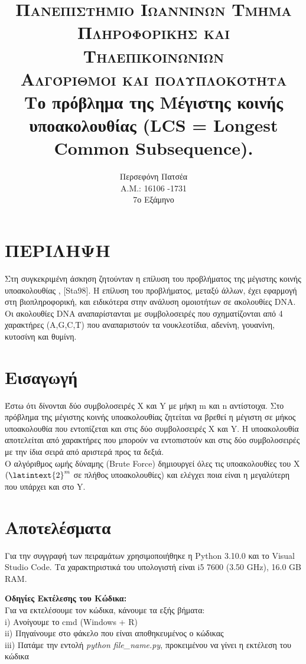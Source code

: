 \documentclass[a4paper,12pt]{report}
\title{
	\usefont{OT1}{bch}{b}{n}
	\normalfont \normalsize \textsc{Πανεπιστήμιο Ιωαννίνων Τμήμα Πληροφορικής και Τηλεπικοινωνίων} \\ [1em]
	\normalfont \normalsize \textsc{Αλγόριθμοι και πολυπλοκότητα} \\[0.5cm]
	\huge Το πρόβλημα της Μέγιστης κοινής υποακολουθίας ({\lat LCS = Longest Common Subsequence}).
	\\[0.5cm]
}
\author{ Περσεφόνη Πατσέα 
	\\Α.Μ.: 16106 -1731 
	\\ 7ο Εξάμηνο}
\newcommand{\lat} {\latintext}
\begin{document}
	\maketitle
	
	\section*{ΠΕΡΙΛΗΨΗ} 
	Στη συγκεκριμένη άσκηση ζητούνταν η επίλυση του προβλήματος της μέγιστης κοινής υποακολουθίας {\lat [Bla20], [Sta98]}. Η επίλυση του προβλήματος, μεταξύ άλλων, έχει εφαρμογή στη βιοπληροφορική, και ειδικότερα στην ανάλυση ομοιοτήτων σε ακολουθίες {\lat DNA}. Οι ακολουθίες {\lat DNA} αναπαρίστανται με συμβολοσειρές που σχηματίζονται από 4 χαρακτήρες ({\lat A,G,C,T}) που αναπαριστούν τα νουκλεοτίδια, αδενίνη, γουανίνη, κυτοσίνη και θυμίνη.
	\vspace{0.5cm}
	
	\section{Εισαγωγή}
	Έστω ότι δίνονται δύο συμβολοσειρές {\lat X} και {\lat Y} με μήκη {\lat m} και {\lat n} αντίστοιχα. Στο πρόβλημα της μέγιστης κοινής υποακολουθίας ζητείται να βρεθεί η μέγιστη σε μήκος υποακολουθία που εντοπίζεται και στις δύο συμβολοσειρές {\lat X} και {\lat Y}. Η υποακολουθία αποτελείται από χαρακτήρες που μπορούν να εντοπιστούν και στις δύο συμβολοσειρές με την ίδια σειρά από αριστερά προς τα δεξιά.
	\\Ο αλγόριθμος ωμής δύναμης ({\lat Brute Force}) δημιουργεί όλες τις υποακολουθίες του {\lat X} $({\lat {2}^{m}}$ σε πλήθος υποακολουθίες) και ελέγχει ποια είναι η μεγαλύτερη που υπάρχει και στο {\lat Y}.
	\vspace{0.5cm}
	
	\section{Αποτελέσματα}
	Για την συγγραφή των πειραμάτων χρησιμοποιήθηκε η {\lat Python 3.10.0} και το {\lat Visual Studio Code}. Τα χαρακτηριστικά του υπολογιστή είναι {\lat i5 7600 (3.50 GHz), 16.0 GB RAM}.  
	
	\vspace{0.7cm}
	
	\textbf{Οδηγίες Εκτέλεσης του Κώδικα:}
	\\Για να εκτελέσουμε τον κώδικα, κάνουμε τα εξής βήματα:
	\\ {\lat i)} Ανοίγουμε το {\lat cmd (Windows + R)}
	\\ {\lat ii)} Πηγαίνουμε στο φάκελο που είναι αποθηκευμένος ο κώδικας
	\\ {\lat iii)} Πατάμε την εντολή {\textit {\lat python file\_name.py}}, προκειμένου να γίνει η εκτέλεση του κώδικα
	 
\end{document}
